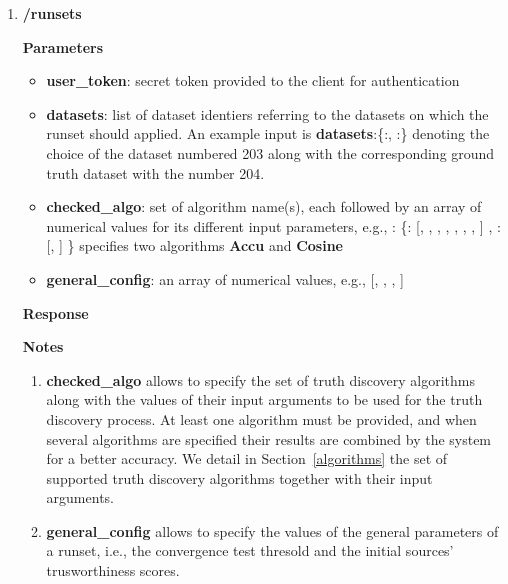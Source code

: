 \documentclass[a4paper,10pt]{scrartcl}
\newcommand{\lamine}[1]{\textcolor{blue}{#1}}
\begin{document}
\begin{enumerate}
%
 \item \textbf{/runsets}
\textbf{Parameters}
\begin{itemize}
 \item \textbf{user\_token}: secret token provided to the client for authentication 
 \item \textbf{datasets}: list of dataset identiers referring to the datasets on which the runset should applied. An example
 input is \textbf{datasets}:\{:, :\} denoting the choice of the dataset
 numbered 203 along with the corresponding ground truth dataset with the number 204. 
 \item  \textbf{checked\_algo}: set of algorithm name(s), each followed by an array of numerical values 
 for its different input parameters, e.g., : \{: [, , , , , , , ] , : [, ] \}
specifies two algorithms \textbf{Accu} and \textbf{Cosine}
 \item \textbf{general\_config}: an array of numerical values, e.g., [, , , ]
\end{itemize}
\textbf{Response}
\textbf{Notes}
\begin{enumerate}
 \item \textbf{checked\_algo} allows to specify the set of truth discovery algorithms along with the values of their input arguments to be used for the truth discovery process. At least one algorithm must be provided, and when several algorithms
 are specified their results are combined by the system for a better accuracy. We detail in Section~\ref{algorithms} the set of supported truth discovery algorithms together with their input arguments.
\item \textbf{general\_config} allows to specify the values of the general parameters of a runset, i.e., the convergence test thresold and the initial sources' trusworthiness scores.
 \end{enumerate}
\end{enumerate}
\end{document}
